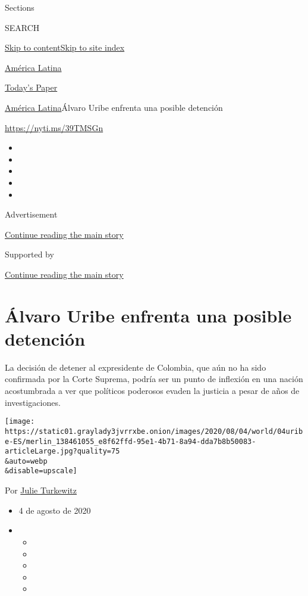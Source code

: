 Sections

SEARCH

\protect\hyperlink{site-content}{Skip to
content}\protect\hyperlink{site-index}{Skip to site index}

\href{https://www.nytimes3xbfgragh.onion/es/section/america-latina}{América
Latina}

\href{https://myaccount.nytimes3xbfgragh.onion/auth/login?response_type=cookie\&client_id=vi}{}

\href{https://www.nytimes3xbfgragh.onion/section/todayspaper}{Today's
Paper}

\href{/es/section/america-latina}{América Latina}\textbar{}Álvaro Uribe
enfrenta una posible detención

\url{https://nyti.ms/39TMSGn}

\begin{itemize}
\item
\item
\item
\item
\item
\end{itemize}

Advertisement

\protect\hyperlink{after-top}{Continue reading the main story}

Supported by

\protect\hyperlink{after-sponsor}{Continue reading the main story}

\hypertarget{uxe1lvaro-uribe-enfrenta-una-posible-detenciuxf3n}{%
\section{Álvaro Uribe enfrenta una posible
detención}\label{uxe1lvaro-uribe-enfrenta-una-posible-detenciuxf3n}}

La decisión de detener al expresidente de Colombia, que aún no ha sido
confirmada por la Corte Suprema, podría ser un punto de inflexión en una
nación acostumbrada a ver que políticos poderosos evaden la justicia a
pesar de años de investigaciones.

\texttt{[image: https://static01.graylady3jvrrxbe.onion/images/2020/08/04/world/04uribe-ES/merlin\_138461055\_e8f62ffd-95e1-4b71-8a94-dda7b8b50083-articleLarge.jpg?quality=75\\\&auto=webp\\\&disable=upscale]}

Por \href{https://www.nytimes3xbfgragh.onion/by/julie-turkewitz}{Julie
Turkewitz}

\begin{itemize}
\item
  4 de agosto de 2020
\item
  \begin{itemize}
  \item
  \item
  \item
  \item
  \item
  \end{itemize}
\end{itemize}

